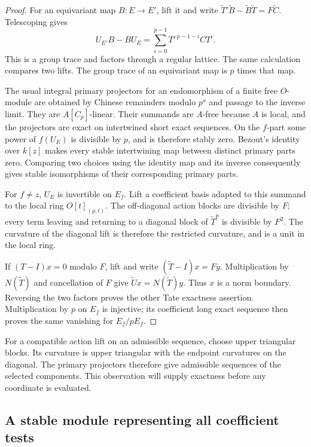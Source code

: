 \begin{proof}
For an equivariant map $B:E\to E'$, lift it and write
$\widetilde T'\widetilde B-\widetilde B\widetilde T=F\widetilde C$.
Telescoping gives
\[
 U_{E'}B-BU_E
 =\sum_{i=0}^{p-1}T'^{\,p-1-i}CT^i.
\]
This is a group trace and factors through a regular lattice.
The same calculation compares two lifts.  The group trace of
an equivariant map is $p$ times that map.

The usual integral primary projectors for an endomorphism of a
finite free $O$-module are obtained by Chinese remainders modulo
$p^a$ and passage to the inverse limit.  They are $A[C_p]$-linear.
Their summands are $A$-free because $A$ is local, and the
projectors are exact on intertwined short exact sequences.
On the $f$-part some power of $f(U_E)$ is divisible by $p$,
and is therefore stably zero.  Bezout's identity over $k[z]$
makes every stable intertwining map between distinct primary
parts zero.  Comparing two choices using the identity map and
its inverse consequently gives stable isomorphisms of their
corresponding primary parts.

For $f\ne z$, $U_E$ is invertible on $E_f$.  Lift a coefficient
basis adapted to this summand to the local ring
$O[t]_{(p,t)}$.  The off-diagonal action blocks are divisible
by $F$; every term leaving and returning to a diagonal block
of $\widetilde T^p$ is divisible by $F^2$.
The curvature of the diagonal lift is therefore the restricted
curvature, and is a unit in the local ring.

If $(T-I)x=0$ modulo $F$, lift and write
$(\widetilde T-I)x=Fy$.  Multiplication by $N(\widetilde T)$
and cancellation of $F$ give
$\widetilde Ux=N(\widetilde T)y$.
Thus $x$ is a norm boundary.  Reversing the two factors proves
the other Tate exactness assertion.  Multiplication by $p$
on $E_f$ is injective; its coefficient long exact sequence
then proves the same vanishing for $E_f/pE_f$.
\end{proof}

For a compatible action lift on an admissible sequence, choose
upper triangular blocks.  Its curvature is upper triangular
with the endpoint curvatures on the diagonal.  The primary
projectors therefore give admissible sequences of the selected
components.  This observation will supply exactness before any
coordinate is evaluated.

\subsection{A stable module representing all coefficient tests}


